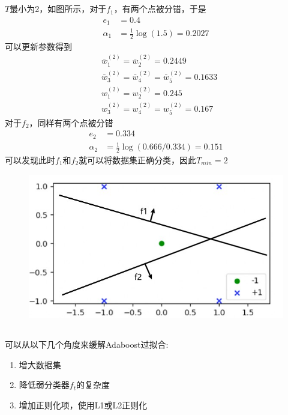 \documentclass[12pt, a4paper]{article}
\begin{document}
\subsection{}

$T$最小为2，如图所示，对于$f_1$，有两个点被分错，于是
\begin{align*}
    e_1&=0.4\\
    \alpha_1&=\frac{1}{2}\log(1.5)=0.2027
\end{align*}
可以更新参数得到
\begin{align*}
    &\bar{w}_1^{(2)}=\bar{w}^{(2)}_2=0.2449\\
    &\bar{w}^{(2)}_3=\bar{w}_4^{(2)}=\bar{w}_5^{(2)}=0.1633\\
    &w_1^{(2)}=w_2^{(2)}=0.245\\
    &w_3^{(2)}=w_4^{(2)}=w_5^{(2)}=0.167
\end{align*}
对于$f_2$，同样有两个点被分错
\begin{align*}
    e_2&=0.334\\
    \alpha_2&=\frac{1}{2}\log(0.666/0.334)=0.151
\end{align*}
可以发现此时$f_1$和$f_2$就可以将数据集正确分类，因此$T_{min}=2$

\begin{figure}
    \centering
    \includegraphics{img/a4_1.jpg}
\end{figure}

\subsection{}

可以从以下几个角度来缓解Adaboost过拟合:
\begin{enumerate}
    \item 增大数据集
    \item 降低弱分类器$f_t$的复杂度
    \item 增加正则化项，使用L1或L2正则化
\end{enumerate}
\end{document}
